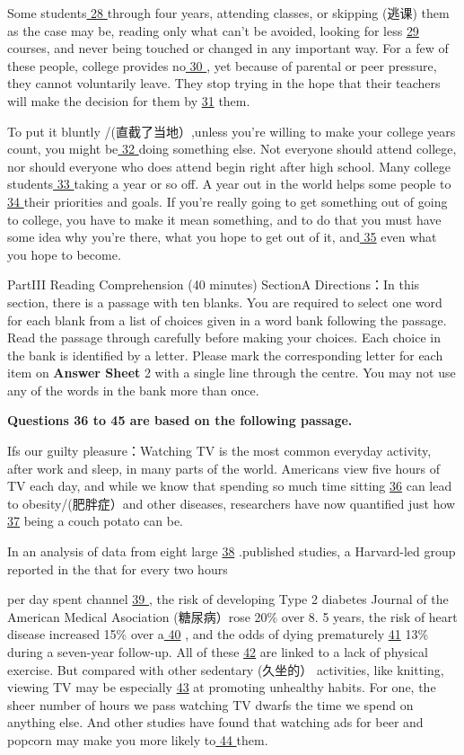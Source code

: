 \documentclass[UTF8,11pt]{ctexart}
\begin{document}
Some students\uline{ 28 }through four years, attending classes, or skipping (逃课) them as the case may be, reading only what can’t be avoided, looking for less \uline{29} courses, and never being touched or changed in any important way. For a few of these people, college provides no\uline{ 30 }, yet because of parental or peer pressure, they cannot voluntarily leave. They stop trying in the hope that their teachers will make the decision for them by \uline{31} them.


To put it bluntly /(直截了当地）,unless you’re willing to make your college years count, you might be\uline{ 32 }doing something else. Not everyone should attend college, nor should everyone who does attend begin right after high school. Many college students\uline{ 33 }taking a year or so off. A year out in the world helps some people to \uline{34 }their priorities and goals. If you’re really going to get something out of going to college, you have to make it mean something, and to do that you must have some idea why you’re there, what you hope to get out of it, and\uline{ 35} even what you hope to become.


PartIII Reading Comprehension (40 minutes) SectionA Directions：In this section, there is a passage with ten blanks. You are required to select one word for each blank from a list of choices given in a word bank following the passage. Read the passage through carefully before making your choices. Each choice in the bank is identified by a letter. Please mark the corresponding letter for each item on \textbf{Answer Sheet} 2 with a single line through the centre. You may not use any of the words in the bank more than once.


\textbf{Questions 36 to 45 are based on the following passage.}


Ifs our guilty pleasure：Watching TV is the most common everyday activity, after work and sleep, in many parts of the world. Americans view five hours of TV each day, and while we know that spending so much time sitting \uline{36} can lead to obesity/(肥胖症）and other diseases, researchers have now quantified just how\uline{ 37} being a couch potato can be.


In an analysis of data from eight large \uline{38} .published studies, a Harvard-led group reported in the that for every two hours


per day spent channel \uline{39 }, the risk of developing Type 2 diabetes Journal of the American Medical Asociation (糖尿病）rose 20\% over 8. 5 years, the risk of heart disease increased 15\% over a\uline{ 40} , and the odds of dying prematurely \uline{41} 13\% during a seven-year follow-up. All of these \uline{42} are linked to a lack of physical exercise. But compared with other sedentary (久坐的） activities, like knitting, viewing TV may be especially \uline{43} at promoting unhealthy habits. For one, the sheer number of hours we pass watching TV dwarfs the time we spend on anything else. And other studies have found that watching ads for beer and popcorn may make you more likely to\uline{ 44 }them.
\end{document}

